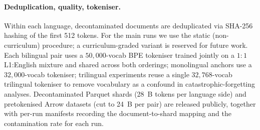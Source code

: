  

\paragraph{Deduplication, quality, tokeniser.} Within each language, decontaminated documents are deduplicated via SHA-256 hashing of the first 512 tokens. For the main runs we use the static (non-curriculum) procedure; a curriculum-graded variant is reserved for future work. Each bilingual pair uses a $50{,}000$-vocab BPE tokeniser trained jointly on a $1{:}1$ L1:English mixture and shared across both orderings; monolingual anchors use a $32{,}000$-vocab tokeniser; trilingual experiments reuse a single $32{,}768$-vocab trilingual tokeniser to remove vocabulary as a confound in catastrophic-forgetting analyses. Decontaminated Parquet shards (28~B tokens per language side) and pretokenised Arrow datasets (cut to 24~B per pair) are released publicly, together with per-run manifests recording the document-to-shard mapping and the contamination rate for each run.
 
 
